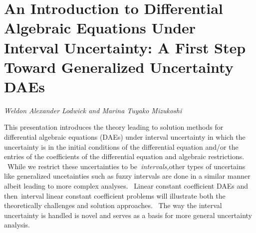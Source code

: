 \documentclass[../booklet.tex]{subfiles}
\begin{document}
\section[An Introduction to Differential Algebraic Equations Under Interval Uncertainty: A First Step Toward Generalized Uncertainty DAEs. {\it Weldon Alexander Lodwick and Marina Tuyako Mizukoshi}]{An Introduction to Differential Algebraic Equations Under Interval Uncertainty: A First Step Toward Generalized Uncertainty DAEs}
 

\begin{center}
  {\it Weldon Alexander Lodwick and Marina Tuyako Mizukoshi}
\end{center}

\vskip 0.8cm


This presentation introduces the theory leading to solution methods for
differential algebraic equations (DAEs) under interval uncertainty in which
the uncertainty is in the initial conditions of the differential equation
and/or the entries of the coefficients of the differential equation and
algebraic restrictions. \ While we restrict these uncertainties to
be\textit{\ intervals,}other types of uncertains like generalized uncetainties
such as fuzzy intervals are done in a similar manner albeit leading to more
complex analyses. \ Linear constant coefficient DAEs and then\ interval linear
constant coefficient problems will illustrate both the theoretically
challenges and solution approaches. \ The way the interval uncertainty is
handled is novel and serves as a basis for more general uncertainty analysis.
\end{document}
